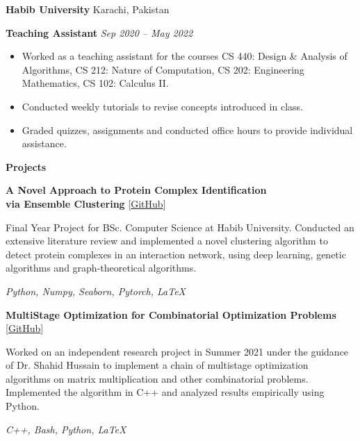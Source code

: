 \documentclass[12pt, a4paper]{article}
\begin{document}
\vspace{12pt}
\textbf{Habib University} \hfill Karachi, Pakistan

\textbf{Teaching Assistant} \hfill \textit{Sep 2020 -- May 2022}

\begin{itemize}[noitemsep, topsep=0pt, partopsep=0pt, parsep=0pt]
    \item Worked as a teaching assistant for the courses CS 440: Design \& Analysis of Algorithms, CS 212: Nature of Computation, CS 202: Engineering Mathematics, CS 102: Calculus II.
    \item Conducted weekly tutorials to revise concepts introduced in class. 
    \item Graded quizzes, assignments and conducted office hours to provide individual assistance. 
\end{itemize}



\begin{center}
    \large\textbf{Projects}
\end{center}
\textbf{A Novel Approach to Protein Complex Identification \\ via Ensemble Clustering}	\hfill [\href{https://github.com/hurryingauto3/PPI-Complex-Prediction}{GitHub}] 
\begin{center}
    \parbox{0.9\linewidth}{
        Final Year Project for BSc. Computer Science at Habib University. Conducted an extensive literature review and implemented a novel clustering algorithm to detect protein complexes in an interaction network, using deep learning, genetic algorithms and graph-theoretical algorithms.
        
        \textit{Python, Numpy, Seaborn, Pytorch, \LaTeX}
    }
\end{center}

\textbf{MultiStage Optimization for Combinatorial Optimization Problems} \hfill [\href{https://github.com/m-usaid/Research-CombinatorialOptimization-DynamicProgramming}{GitHub}]
\begin{center}    
\parbox{0.9\linewidth}{
    Worked on an independent research project in Summer 2021 under the guidance of Dr. Shahid Hussain to implement a chain of multistage optimization algorithms on matrix multiplication and other combinatorial problems. Implemented the algorithm in C++ and analyzed results empirically using Python. 

\textit{C++, Bash, Python, \LaTeX}
}
\end{center}
\end{document}
